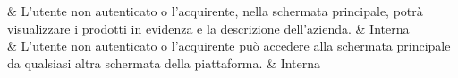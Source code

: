  & L'utente non autenticato o l'acquirente, nella schermata principale, potrà visualizzare i prodotti in evidenza e la descrizione dell'azienda. & Interna \\

 & L'utente non autenticato o l'acquirente può accedere alla schermata principale da qualsiasi altra schermata della piattaforma. & Interna \\
